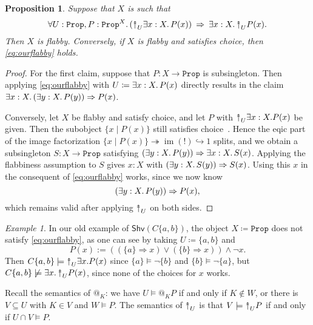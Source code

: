 \documentclass[11pt, oneside, article]{memoir}
\makeatletter
\theoremstyle{plain}
\newtheorem{proposition}[theorem]{Proposition}
\theoremstyle{definition}
\theoremstyle{remark}
\newtheorem{example}[theorem]{Example}
\DeclareMathOperator{\im}{im}
\newcommand{\const}[1]{\mathtt{#1}}
\newcommand{\Fun}[1]{\mathsf{#1}}
\newcommand{\Shv}{\Fun{Shv}}
\newcommand{\Prop}{\const{Prop}}
\newcommand{\AtSymbol}{{@}}
\newcommand{\InSymbol}{{\upclose}}%
\newcommand{\At}[2][]{\AtSymbol^{#1}_{#2}}
\newcommand{\In}[2][]{\InSymbol^{#1}_{#2}}
\newcommand{\upclose}{{\rotatebox[origin=c]{90}{$\twoheadrightarrow$}}}
\newcommand{\imp}{\Rightarrow}
\makeatother
\begin{document}
\begin{proposition}\label{prop.flabbiness_equivalence}
Suppose that $X$ is such that
\begin{equation}\label{eq:ourflabby}
	\forall U : \Prop, P : \Prop^X . \left( \In{U} \exists x : X\ldotp P(x) \right) \: \imp \: \exists x : X \ldotp \In{U} P(x).
\end{equation}
Then $X$ is flabby. Conversely, if $X$ is flabby and satisfies choice, then \cref{eq:ourflabby} holds.
\end{proposition}


\begin{proof}
For the first claim, suppose that $P : X \to \Prop$ is subsingleton. Then applying \cref{eq:ourflabby} with $U \coloneqq \exists x : X \ldotp P(x)$ directly results in the claim $\exists x : X\ldotp (\exists y : X\ldotp P(y)) \imp P(x)$.

Conversely, let $X$ be flabby and satisfy choice, and let $P$ with $\In{U} \exists x : X. P(x)$ be given. Then the subobject $\{ x \mid P(x) \}$ still satisfies choice~\cite[Lemma D.4.5.9]{Johnstone:2002a}. Hence the eqic part of the image factorization $\{ x \mid P(x) \} \twoheadrightarrow \im(!) \hookrightarrow 1$ splits, and we obtain a subsingleton $S : X\to\Prop$ satisfying $(\exists y : X\ldotp P(y)) \imp \exists x : X\ldotp S(x)$. Applying the flabbiness assumption to $S$ gives $x : X$ with $(\exists y : X\ldotp S(y)) \imp S(x)$. Using this $x$ in the consequent of \cref{eq:ourflabby} works, since we now know
\[
	(\exists y : X\ldotp P(y)) \imp P(x),
\]
which remains valid after applying $\In{U}$ on both sides.
\end{proof}

\begin{example}
In our old example of $\Shv(C\{a,b\})$, the object $X \coloneqq \Prop$ does not satisfy \eqref{eq:ourflabby}, as one can see by taking $U \coloneqq \{a,b\}$ and
\[
	P(x) := ((\{a\}\imp x) \vee (\{b\}\imp x)) \wedge \neg x.
\]
Then $C\{a,b\} \models \In{U} \exists x. P(x)$ since $\{a\} \models \neg \{b\}$ and $\{b\} \models \neg \{a\}$, but $C\{a,b\} \not\models \exists x\ldotp \In{U} P(x)$, since none of the choices for $x$ works.
\end{example}

Recall the semantics of $\At{K}$: we have $U \models \At{K} P$ if and only if $K \not\in W$, or there is $V\subseteq U$ with $K\in V$ and $W \models P$. The semantics of $\In{U}$ is that $V \models \In{U} P$ if and only if $U \cap V \models P$.
\end{document}

